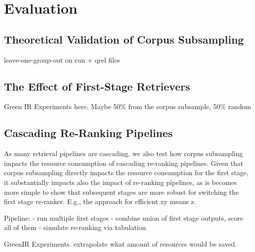 \section{Evaluation}

\subsection{Theoretical Validation of Corpus Subsampling}

leave-one-group-out on run + qrel files

\subsection{The Effect of First-Stage Retrievers}

Green IR Experiments here.
Maybe 50\% from the corpus subsample, 50\% random

\subsection{Cascading Re-Ranking Pipelines}

As many retrieval pipelines are cascading, we also test how corpus subsampling impacts the resource consumption of cascading re-ranking pipelines. Given that corpus subsampling directly impacts the resource consumption for the first stage, it substantially impacts also the impact of re-ranking pipelines, as is becomes more simple to show that subsequent stages are more robust for switching the first stage re-ranker. E.g., the approach for efficient xy means z.

Pipeline:
- run multiple first stages
- combine union of first stage outputs, score all of them
- simulate re-ranking via tabulation

{\color{red} GreenIR Experiments. extrapolate what amount of resources would be saved.}
